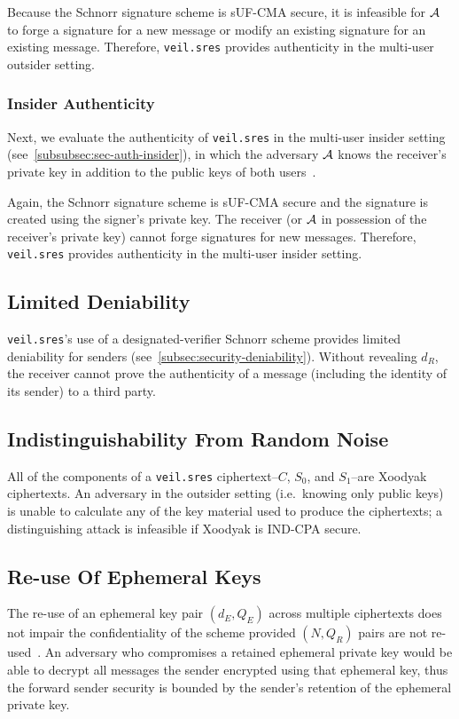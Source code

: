 Because the Schnorr signature scheme is sUF-CMA secure, it is infeasible for $\mathcal{A}$ to forge a signature for a new
message or modify an existing signature for an existing message.
Therefore, \texttt{veil.sres} provides authenticity in the multi-user outsider setting.

\subsubsection{Insider Authenticity}

Next, we evaluate the authenticity of \texttt{veil.sres} in the multi-user insider setting
(see~\ref{subsubsec:sec-auth-insider}), in which the adversary $\mathcal{A}$ knows the receiver's private key in addition
to the public keys of both users~\cite[p. 48]{baek2010}.

Again, the Schnorr signature scheme is sUF-CMA secure and the signature is created using the signer's private key.
The receiver (or $\mathcal{A}$ in possession of the receiver's private key) cannot forge signatures for new messages.
Therefore, \texttt{veil.sres} provides authenticity in the multi-user insider setting.

\subsection{Limited Deniability}\label{subsec:veil.sres-deniability}

\texttt{veil.sres}'s use of a designated-verifier Schnorr scheme provides limited deniability for senders
(see~\ref{subsec:security-deniability}).
Without revealing $d_R$, the receiver cannot prove the authenticity of a message (including the identity of its sender)
to a third party.

\subsection{Indistinguishability From Random Noise}\label{subsec:veil.sres-indistinguishability}

All of the components of a \texttt{veil.sres} ciphertext--$C$, $S_0$, and $S_1$--are Xoodyak ciphertexts.
An adversary in the outsider setting (i.e.\ knowing only public keys) is unable to calculate any of the key material
used to produce the ciphertexts;
a distinguishing attack is infeasible if Xoodyak is IND-CPA secure.

\subsection{Re-use Of Ephemeral Keys}\label{subsec:veil.sres-re-using-ephemeral-keys}

The re-use of an ephemeral key pair $(d_E, Q_E)$ across multiple ciphertexts does not impair the confidentiality of the
scheme provided $(N, Q_R)$ pairs are not re-used~\cite{bellare2003}.
An adversary who compromises a retained ephemeral private key would be able to decrypt all messages the sender encrypted
using that ephemeral key, thus the forward sender security is bounded by the sender's retention of the ephemeral private
key.
